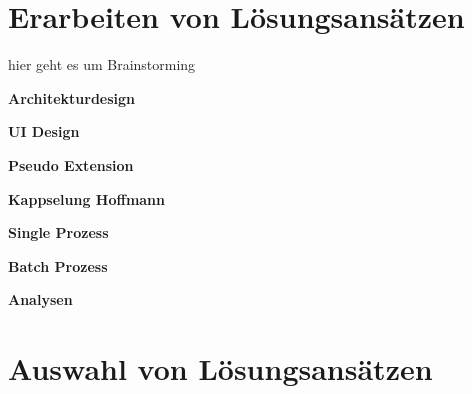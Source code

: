 \section{Erarbeiten von Lösungsansätzen}
\label{sec:lösungsansätze} hier geht es um Brainstorming

\textbf{Architekturdesign}

\textbf{UI Design}

\textbf{Pseudo Extension}

\textbf{Kappselung Hoffmann}

\textbf{Single Prozess}

\textbf{Batch Prozess}

\textbf{Analysen}

\section{Auswahl von Lösungsansätzen}